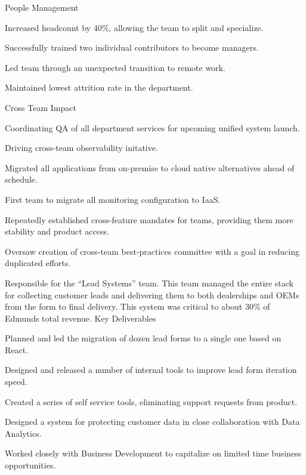 \documentclass[]{deedy-resume-openfont}
\begin{document}
\sectionsep
People Management
\begin{tightemize}
\item Increased headcount by 40\%, allowing the team to split and specialize.
\item Successfully trained two individual contributors to become managers.
\item Led team through an unexpected transition to remote work.
\item Maintained lowest attrition rate in the department.
\end{tightemize}
\sectionsep
Cross Team Impact
\begin{tightemize}
\item Coordinating QA of all department services for upcoming unified system launch.
\item Driving cross-team observability initative.
\item Migrated all applications from on-premise to cloud native alternatives ahead of schedule.
\item First team to migrate all monitoring configuration to IaaS.
\item Repeatedly established cross-feature mandates for teams, providing them more stability and product access.
\item Oversaw creation of cross-team best-practices committee with a goal in reducing duplicated efforts.
\end{tightemize}
\sectionsep

\vspace{\topsep}
Responsible for the ``Lead Systems'' team. This team managed the entire stack for collecting customer leads and delivering them to both dealerships and OEMs from the form to final delivery. This system was critical to about 30\% of Edmunds total revenue.
\vspace{\topsep}
\newline
Key Deliverables
\begin{tightemize}
\item Planned and led the migration of dozen lead forms to a single one based on React.
\item Designed and released a number of internal tools to improve lead form iteration speed.
\item Created a series of self service tools, eliminating support requests from product.
\item Designed a system for protecting customer data in close collaboration with Data Analytics.
\item Worked closely with Business Development to capitalize on limited time business opportunities.
\end{tightemize}
\end{document}

